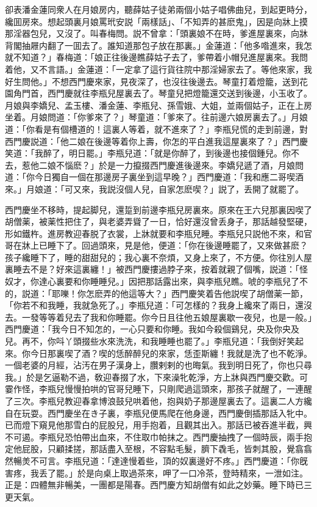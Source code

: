 卻表潘金蓮同衆人在月娘房内，聽薛姑子徒弟兩個小姑子唱佛曲兒，到起更時分，纔囬房來。想起頭裏月娘罵玳安説「兩樣話」、「不知弄的甚麽鬼」，因是向牀上摸那淫器包兒，又沒了。叫春梅問。説不曾拿：「頭裏娘不在時，爹進屋裏來，向牀背閣抽屜内翻了一囬去了。誰知道那包子放在那裏。」金蓮道：「他多喒進來，我怎就不知道？」春梅道：「娘正往後邊瞧薛姑子去了，爹帶着小帽兒進屋裏來。我問着他，又不言語。」金蓮道：「一定拿了這行貨往院中那淫婦家去了。等他來家，我好生問他。」不想西門慶來家，見夜深了，也沒往後邊去。琴童打着燈籠，送到花園角門首，西門慶就往李瓶兒屋裏去了。琴童兒把燈籠還交送到後邊，小玉收了。月娘與李嬌兒、孟玉樓、潘金蓮、李瓶兒、孫雪娥、大姐，並兩個姑子，正在上房坐着。月娘問道：「你爹來了？」琴童道：「爹來了。往前邊六娘房裏去了。」月娘道：「你看是有個槽道的！這裏人等着，就不進來了？」李瓶兒慌的走到前邊，對西門慶説道：「他二娘在後邊等着你上壽，你怎的平白進我這屋裏來了？」西門慶笑道：「我醉了，明日罷。」李瓶兒道：「就是你醉了，到後邊也接個鍾兒。你不去，惹他二娘不惱麽？」於是一力攛掇西門慶進後邊來。李嬌兒遞了酒，月娘問道：「你今日獨自一個在那邊房子裏坐到這早晚？」西門慶道：「我和應二哥喫酒來。」月娘道：「可又來，我説沒個人兒，自家怎麽喫？」説了，丢開了就罷了。

西門慶坐不移時，提起脚兒，還踅到前邊李瓶兒房裏來。原來在王六兒那裏因喫了胡僧薬，被薬性把住了，與老婆弄聳了一日，恰好還沒曾丢身子，那話越發堅硬，形如鐵杵。進房教迎春脱了衣裳，上牀就要和李瓶兒睡。李瓶兒只説他不來，和官哥在牀上已睡下了。回過頭來，見是他，便道：「你在後邊睡罷了，又來做甚麽？孩子纔睡下了，睡的甜甜兒的；我心裏不奈煩，又身上來了，不方便。你往別人屋裏睡去不是？好來這裏纏！」被西門慶摟過脖子來，按着就親了個嘴，説道：「怪奴才，你達心裏要和你睡睡兒。」因把那話露出來，與李瓶兒瞧。唬的李瓶兒了不的，説道：「耶嚛！你怎麽弄的他這等大？」西門慶笑着告他説喫了胡僧薬一節，「你若不和我睡，我就急死了。」李瓶兒道：「可怎樣的？我身上纔來了兩日，還沒去。一發等等着兒去了我和你睡罷。你今日且往他五娘屋裏歇一夜兒，也是一般。」西門慶道：「我今日不知怎的，一心只要和你睡。我如今殺個鷄兒，央及你央及兒。再不，你呌丫頭掇些水來洗洗，和我睡睡也罷了。」李瓶兒道：「我倒好笑起來。你今日那裏喫了酒？喫的恁醉醉兒的來家，恁歪斯纏！我就是洗了也不乾淨。一個老婆的月經，沾汚在男子漢身上，臢剌剌的也晦氣。我到明日死了，你也只尋我。」於是乞逼勒不過，敎迎春掇了水，下來澡牝乾淨，方上牀與西門慶交歡。可霎作怪，李瓶兒慢慢拍哄的官哥兒睡下，只剛爬過這頭來，那孩子就醒了，一連醒了三次。李瓶兒教迎春拿博浪鼓兒哄着他，抱與奶子那邊屋裏去了。這裏二人方纔自在玩耍。西門慶坐在き子裏，李瓶兒便馬爬在他身邊，西門慶倒插那話入牝中。已而燈下窺見他那雪白的屁股兒，用手抱着，且觀其出入。那話已被吞進半截，興不可遏。李瓶兒恐怕帶出血來，不住取巾帕抹之。西門慶抽拽了一個時辰，兩手抱定他屁股，只顧揉搓，那話盡入至根，不容點毛髮，臍下毳毛，皆刺其股，覺翕翕然暢羙不可言。李瓶兒道：「達達慢着些，頂的奴裏邊好不疼。」西門慶道：「你旣害疼，我丢了罷。」於是向桌上取過茶來，呷了一口冷茶，登時精來，一泄如注。正是：四體無非暢美，一團都是陽春。西門慶方知胡僧有如此之妙藥。睡下時已三更天氣。


